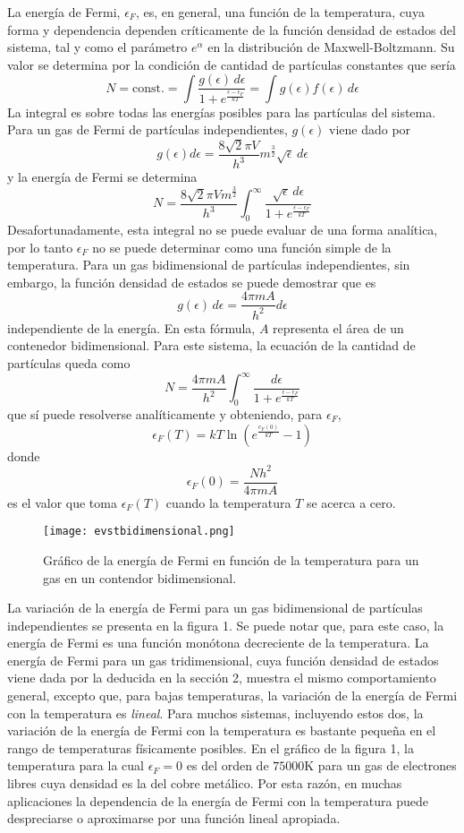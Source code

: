 \documentclass[12pt,a4paper]{article}
\def\e{{\epsilon}} %
\begin{document}
La energía de Fermi, $\e_{F}$, es, en general, una función de la temperatura, cuya forma y dependencia dependen críticamente de la función densidad de estados del sistema, tal y como el parámetro $e^{\alpha}$ en la distribución de Maxwell-Boltzmann. Su valor se determina por la condición de cantidad de partículas constantes que sería
\[ N=\textrm{const.}=\int \frac{g(\e)\,d\e}{1+e^{\frac{\e-\e_{F}}{kT}}}=\int g(\e)f(\e) \, d\e \]
La integral es sobre todas las energías posibles para las partículas del sistema. Para un gas de Fermi de partículas independientes, $g(\e)$ viene dado por
\[ g(\e)d\e=\frac{8\sqrt{2} \pi V}{h^{3}}m^{\frac{3}{2}} \sqrt{\e} \, d\e \]
y la energía de Fermi se determina
\[ N=\frac{8 \sqrt{2}\pi V m^{\frac{3}{2}}}{h^{3}} \int _{0}^{\infty} \frac{\sqrt{\e} \, d\e}{1+e^{\frac{\e-\e_{F}}{kT}}} \]
Desafortunadamente, esta integral no se puede evaluar de una forma analítica, por lo tanto $\e_{F}$ no se puede determinar como una función simple de la temperatura. Para un gas bidimensional de partículas independientes, sin embargo, la función densidad de estados se puede demostrar que es
\[ g(\e) \, d\e=\frac{4 \pi m A}{h^{2}}d\e \]
independiente de la energía. En esta fórmula, $A$ representa el área de un contenedor bidimensional. Para este sistema, la ecuación de la cantidad de partículas queda como
\[ N=\frac{4\pi m A}{h^{2}} \int _{0}^{\infty} \frac{d\e}{1+e^{\frac{\e-\e_{F}}{kT}}} \]
que sí puede resolverse analíticamente y obteniendo, para $\e_{F}$,
\[ \e_{F}(T)=kT \ln (e^{\frac{e_{F}(0)}{kT}}-1) \]
donde
\[ \e_{F}(0)=\frac{Nh^{2}}{4 \pi m A} \]
es el valor que toma $\e_{F}(T)$ cuando la temperatura $T$ se acerca a cero.

\begin{figure}[ht!]
\begin{center}
\texttt{[image: evstbidimensional.png]}
\caption{Gráfico de la energía de Fermi en función de la temperatura para un gas en un contendor bidimensional.}
\end{center}
\end{figure}

La variación de la energía de Fermi para un gas bidimensional de partículas independientes se presenta en la figura 1. Se puede notar que, para este caso, la energía de Fermi es una función monótona decreciente de la temperatura. La energía de Fermi para un gas tridimensional, cuya función densidad de estados viene dada por la deducida en la sección 2, muestra el mismo comportamiento general, excepto que, para bajas temperaturas, la variación de la energía de Fermi con la temperatura es \emph{lineal}. Para muchos sistemas, incluyendo estos dos, la variación de la energía de Fermi con la temperatura es bastante pequeña en el rango de temperaturas físicamente posibles. En el gráfico de la figura 1, la temperatura para la cual $\e_{F}=0$ es del orden de $75000$K para un gas de electrones libres cuya densidad es la del cobre metálico. Por esta razón, en muchas aplicaciones la dependencia de la energía de Fermi con la temperatura puede despreciarse o aproximarse por una función lineal apropiada.
\end{document}
